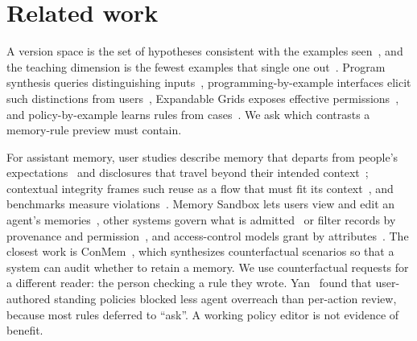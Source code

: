 \section{Related work}
A version space is the set of hypotheses consistent with the examples seen~\cite{mitchell}, and the teaching dimension is the fewest examples that single one out~\cite{goldman}. Program synthesis queries distinguishing inputs~\cite{jha}, programming-by-example interfaces elicit such distinctions from users~\cite{mayer,peleg,regae}, Expandable Grids exposes effective permissions~\cite{grids}, and policy-by-example learns rules from cases~\cite{n}. We ask which contrasts a memory-rule preview must contain.

For assistant memory, user studies describe memory that departs from people's expectations~\cite{chen} and disclosures that travel beyond their intended context~\cite{taheri}; contextual integrity frames such reuse as a flow that must fit its context~\cite{barth}, and benchmarks measure violations~\cite{ci,persist}. Memory Sandbox lets users view and edit an agent's memories~\cite{sandbox}, other systems govern what is admitted~\cite{gated,liu} or filter records by provenance and permission~\cite{mapgraph}, and access-control models grant by attributes~\cite{rbac,abac}. The closest work is ConMem~\cite{conmem}, which synthesizes counterfactual scenarios so that a system can audit whether to retain a memory. We use counterfactual requests for a different reader: the person checking a rule they wrote. Yan~\cite{yan} found that user-authored standing policies blocked less agent overreach than per-action review, because most rules deferred to ``ask''. A working policy editor is not evidence of benefit.
